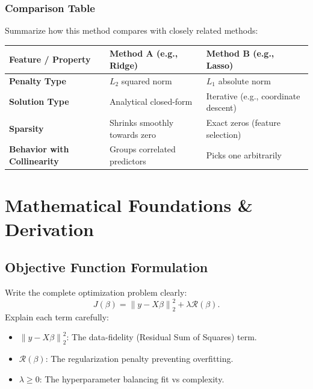\documentclass[11pt,a4paper,oneside]{book}
\newcommand{\norm}[1]{\left\lVert #1\right\rVert}
\begin{document}
\subsection{Comparison Table}
Summarize how this method compares with closely related methods:

\begin{center}
\begin{tabularx}{0.95\textwidth}{>{\bfseries}lXX}
\toprule
Feature / Property & Method A (e.g., Ridge) & Method B (e.g., Lasso) \\
\midrule
Penalty Type & $L_2$ squared norm & $L_1$ absolute norm \\
Solution Type & Analytical closed-form & Iterative (e.g., coordinate descent) \\
Sparsity & Shrinks smoothly towards zero & Exact zeros (feature selection) \\
Behavior with Collinearity & Groups correlated predictors & Picks one arbitrarily \\
\bottomrule
\end{tabularx}
\end{center}


\chapter{Mathematical Foundations \& Derivation}

\section{Objective Function Formulation}
Write the complete optimization problem clearly:
\begin{equation}
  \boxed{J(\beta) = \norm{y - X\beta}_2^2 + \lambda \mathcal{R}(\beta).}
  \label{eq:objective}
\end{equation}
Explain each term carefully:
\begin{itemize}
  \item $\norm{y - X\beta}_2^2$: The data-fidelity (Residual Sum of Squares) term.
  \item $\mathcal{R}(\beta)$: The regularization penalty preventing overfitting.
  \item $\lambda \geq 0$: The hyperparameter balancing fit vs complexity.
\end{itemize}
\end{document}
